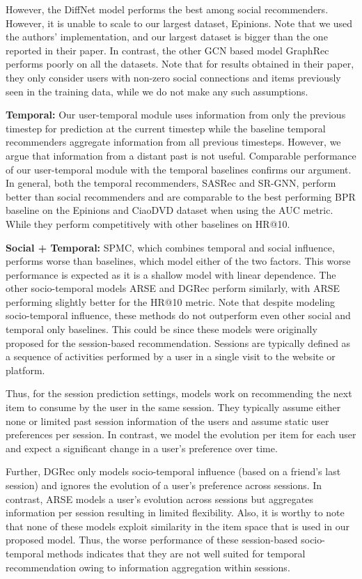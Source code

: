 However, the DiffNet model performs the best among social recommenders. However, it is unable to scale to our largest dataset, Epinions. Note that we used the authors' implementation, and our largest dataset is bigger than the one reported in their paper. In contrast, the other GCN based model GraphRec performs poorly on all the datasets. Note that for results obtained in their paper, they only consider users with non-zero social connections and items previously seen in the training data, while we do not make any such assumptions.

\textbf{Temporal:} Our user-temporal module uses information from only the previous timestep for prediction at the current timestep while the baseline temporal recommenders aggregate information from all previous timesteps. However, we argue that information from a distant past is not useful. Comparable performance of our user-temporal module with the temporal baselines confirms our argument.
In general, both the temporal recommenders, SASRec and SR-GNN, perform better than social recommenders and are comparable to the best performing BPR baseline on the Epinions and CiaoDVD dataset when using the AUC metric. While they perform competitively with other baselines on HR@10.

\textbf{Social + Temporal:} SPMC, which combines temporal and social influence, performs worse than baselines, which model either of the two factors. This worse performance is expected as it is a shallow model with linear dependence. The other socio-temporal models ARSE and DGRec perform similarly, with ARSE performing slightly better for the HR@10 metric. Note that despite modeling socio-temporal influence, these methods do not outperform even other social and temporal only baselines. This could be since these models were originally proposed for the session-based recommendation. Sessions are typically defined as a sequence of activities performed by a user in a single visit to the website or platform.

Thus, for the session prediction settings, models work on recommending the next item to consume by the user in the same session. They typically assume either none or limited past session information of the users and assume static user preferences per session.
In contrast, we model the evolution per item for each user and expect a significant change in a user's preference over time.

Further, DGRec only models socio-temporal influence (based on a friend's last session) and ignores the evolution of a user's preference across sessions. In contrast, ARSE models a user's evolution across sessions but aggregates information per session resulting in limited flexibility. Also, it is worthy to note that none of these models exploit similarity in the item space that is used in our proposed model.
Thus, the worse performance of these session-based socio-temporal methods indicates that they are not well suited for temporal recommendation owing to information aggregation within sessions.

